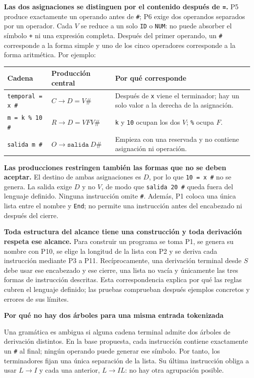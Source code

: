\documentclass[11pt,letterpaper]{article}
\newcommand{\cod}[1]{\texttt{#1}}
\newcommand{\subtitulo}[1]{\vspace{5pt}\textbf{#1}\par\nopagebreak[4]}
\newcommand{\cab}[1]{\rowcolor{cabecera}#1}
\begin{document}
\textbf{Las dos asignaciones se distinguen por el contenido después de \cod{=}.} P5 produce exactamente un operando antes de \cod{\#}; P6 exige dos operandos separados por un operador. Cada $V$ se reduce a un solo \cod{ID} o \cod{NUM}: no puede absorber el símbolo \cod{+} ni una expresión completa. Después del primer operando, un \cod{\#} corresponde a la forma simple y uno de los cinco operadores corresponde a la forma aritmética. Por ejemplo:
\begin{center}
\begin{tabularx}{\textwidth}{|p{4.1cm}|>{\raggedright\arraybackslash}p{3.5cm}|X|}\hline
\cab{\textbf{Cadena}&\textbf{Producción central}&\textbf{Por qué corresponde}}\\\hline
\cod{temporal = x \#}&$C\to D=V\#$&Después de \cod{x} viene el terminador; hay un solo valor a la derecha de la asignación.\\\hline
\cod{m = k \% 10 \#}&$R\to D=VFV\#$&\cod{k} y \cod{10} ocupan los dos $V$; \cod{\%} ocupa $F$.\\\hline
\cod{salida m \#}&$O\to\cod{salida}\ D\#$&Empieza con una reservada y no contiene asignación ni operación.\\\hline
\end{tabularx}\end{center}

\textbf{Las producciones restringen también las formas que no se deben aceptar.} El destino de ambas asignaciones es $D$, por lo que \cod{10 = x \#} no se genera. La salida exige $D$ y no $V$, de modo que \cod{salida 20 \#} queda fuera del lenguaje definido. Ninguna instrucción omite \cod{\#}. Además, P1 coloca una única lista entre el nombre y \cod{End}; no permite una instrucción antes del encabezado ni después del cierre.

\textbf{Toda estructura del alcance tiene una construcción y toda derivación respeta ese alcance.} Para construir un programa se toma P1, se genera su nombre con P10, se elige la longitud de la lista con P2 y se deriva cada instrucción mediante P3 a P11. Recíprocamente, una derivación terminal desde $S$ debe usar ese encabezado y ese cierre, una lista no vacía y únicamente las tres formas de instrucción descritas. Esta correspondencia explica por qué las reglas cubren el lenguaje definido; las pruebas comprueban después ejemplos concretos y errores de sus límites.

\subtitulo{Por qué no hay dos árboles para una misma entrada tokenizada}
Una gramática es ambigua si alguna cadena terminal admite dos árboles de derivación distintos. En la base propuesta, cada instrucción contiene exactamente un \cod{\#} al final; ningún operando puede generar ese símbolo. Por tanto, los terminadores fijan una única separación de la lista. Su última instrucción obliga a usar $L\to I$ y cada una anterior, $L\to IL$: no hay otra agrupación posible.
\end{document}
